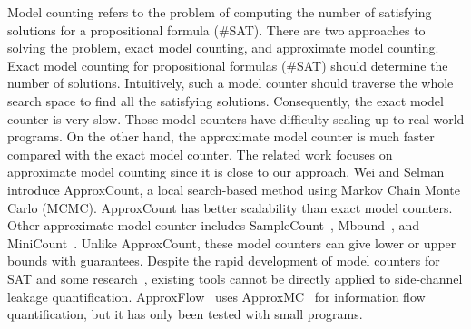 Model counting refers to the problem of computing the number of satisfying
solutions for a propositional formula (\#SAT). There are two approaches to
solving the problem, exact model counting, and approximate model
counting. Exact model counting for propositional formulas (\#SAT) should determine
the number of solutions. Intuitively, such a model counter should traverse the whole
search space to find all the satisfying solutions. Consequently, the exact model counter is very slow. Those model counters have difficulty scaling up to real-world programs.
On the other hand, the approximate model counter is much faster compared with the exact model counter. The related work focuses on approximate model counting since it is close to our approach. Wei and Selman~\cite{wei2005new} introduce
ApproxCount, a local search-based method using Markov Chain Monte
Carlo (MCMC). ApproxCount has better scalability than
exact model counters. Other approximate model counter includes
SampleCount~\cite{gomes2007sampling},
Mbound~\cite{gomes2006model}, and MiniCount~\cite{kroc2008leveraging}.
Unlike ApproxCount, these model counters can give lower or upper bounds with guarantees.
Despite the rapid development of model counters for SAT and some
research~\cite{chistikov2017approximate,phan2015model}, existing tools cannot be directly applied to side-channel leakage quantification.
ApproxFlow~\cite{biondi2018scalable} uses ApproxMC~\cite{chakraborty2016algorithmic} for information flow quantification, but it has only been tested with small programs.

